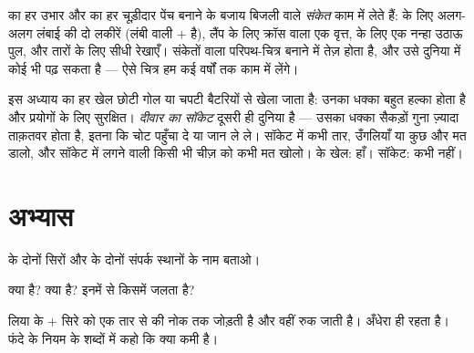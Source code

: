 \begin{remark}[सलीक़े के चित्र]\label{rem:g3:first-electric-circuit:symbols}
 का हर उभार और  का हर चूड़ीदार पेंच बनाने के बजाय बिजली वाले
\emph{संकेत} काम में लेते हैं:  के लिए अलग-अलग लंबाई की दो
लकीरें (लंबी वाली $+$ है), लैंप के लिए क्रॉस वाला एक वृत्त,  के
लिए एक नन्हा उठाऊ पुल, और तारों के लिए सीधी रेखाएँ। संकेतों वाला
परिपथ-चित्र बनाने में तेज़ होता है, और उसे दुनिया में कोई भी पढ़ सकता
है --- ऐसे चित्र हम कई वर्षों तक काम में लेंगे।
\end{remark}

\begin{remark}[बैटरी हाँ, दीवार का सॉकेट कभी नहीं]\label{rem:g3:first-electric-circuit:safety}
इस अध्याय का हर खेल छोटी गोल या चपटी बैटरियों से खेला जाता है: उनका
धक्का बहुत हल्का होता है और प्रयोगों के लिए सुरक्षित। \emph{दीवार का
सॉकेट} दूसरी ही दुनिया है --- उसका धक्का सैकड़ों गुना ज़्यादा
ताक़तवर होता है, इतना कि चोट पहुँचा दे या जान ले ले। सॉकेट में कभी
तार, उँगलियाँ या कुछ और मत डालो, और सॉकेट में लगने वाली किसी भी चीज़
को कभी मत खोलो।  के खेल: हाँ। सॉकेट: कभी नहीं।
\end{remark}

\section{अभ्यास}

\begin{exercise}[$\star$]\label{exo:g3:first-electric-circuit:1}
 के दोनों सिरों और  के दोनों संपर्क स्थानों के नाम बताओ।
\end{exercise}

\begin{exercise}[$\star$]\label{exo:g3:first-electric-circuit:2}
 क्या है?  क्या है?  इनमें से किसमें जलता है?
\end{exercise}

\begin{exercise}[$\star$]\label{exo:g3:first-electric-circuit:3}
लिया  के $+$ सिरे को एक तार से  की नोक तक जोड़ती है और वहीं
रुक जाती है।  अँधेरा ही रहता है। फंदे के नियम के शब्दों में कहो
कि क्या कमी है।
\end{exercise}

